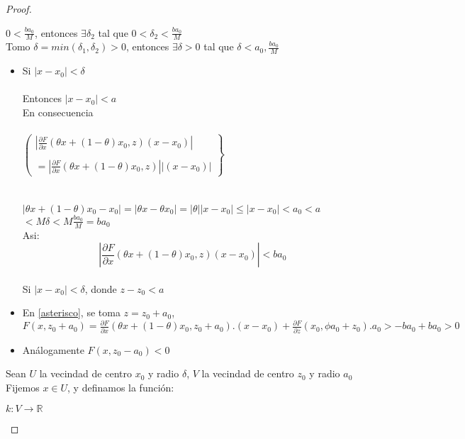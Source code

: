 \begin{proof}
\begin{itemize}
    $0 < \frac{ba_{0}}{M} $, entonces $\exists \delta_{2}$ tal que $0 < \delta_{2} < \frac{ba_{0}}{M}$\\
    
    Tomo $\delta = min(\delta_{1},\delta_{2}) > 0$, entonces $\exists \delta > 0$ tal que $\delta < a_{0}, \frac{ba_{0}}{M}$
\end{itemize}

\begin{itemize}
    \item Si $|x-x_{0}| < \delta$\\\\
    Entonces $|x-x_{0}| < a $\\
    En consecuencia \\\\
    $\left(
      \begin{matrix} 
         |\frac{\partial F}{\partial x}(\theta x + (1-\theta)x_{0}, z)(x-x_{0})| \\\\
         = |\frac{\partial F}{\partial x}(\theta x + (1-\theta)x_{0}, z)||(x-x_{0})|
      \end{matrix}
   \right \}$\\\\ \\$|\theta x + (1-\theta)x_{0}-x_{0}|= |\theta x - \theta x_{0}|= |\theta||x-x_{0}|\leq|x-x_{0}|< a_{0}<a$ $< M\delta <M\frac{ba_{0}}{M}= ba_{0}$\\
Asi: $$|\frac{\partial F}{\partial x}(\theta x + (1-\theta)x_{0},z)(x-x_{0})|< ba_{0}$$\\
Si $|x-x_{0}|< \delta$, donde $z-z_{0}< a$
\end{itemize}
\begin{itemize}
    \item En \ref{asterisco}, se toma $z=z_{0}+a_{0}$,\
    $F(x,z_{0}+a_{0})= \frac{\partial F}{\partial x}(\theta x + (1-\theta)x_{0},z_{0}+a_{0}).(x-x_{0})+ \frac{\partial F}{\partial z}(x_{0},\phi a_{0}+z_{0}).a_{0} > -ba_{0} + ba_{0}> 0$
\end{itemize}
\begin{itemize}
    \item An\'alogamente $F(x,z_{0}-a_{0})< 0 $
\end{itemize}
Sean $U$ la vecindad de centro $x_{0}$ y radio $\delta$, $V$ la vecindad de centro $z_{0}$ y radio $a_{0}$\\
Fijemos $x\in U$, y definamos la funci\'on:
\begin{center}
    $k:V \rightarrow \mathbb{R}$\\

\end{center}
\end{proof}
